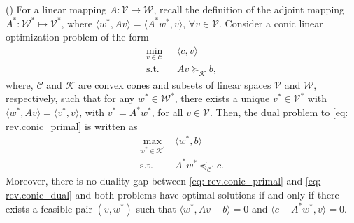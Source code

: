\documentclass[final,onefignum,onetabnum]{class}
\newcommand{\Cs}[1]{\mathcal{#1}} %
\newcommand{\dual}[1]{\Cs{#1}^{\prime}}
\newcommand{\st}{\text{s.t.}}
\begin{document}
\begin{theorem}{(\citet[Proposition~2.1]{shapiro2001duality})}
\label{thm: rev.conic_duality}
For a linear mapping $A: \Cs{V} \mapsto \Cs{W}$, recall the definition of the adjoint mapping $A^{*}: \Cs{W}^{*} \mapsto \Cs{V}^{*}$, where $\langle w^{*}, Av \rangle= \langle A^{*}w^{*}, v \rangle$, $\forall v \in \Cs{V}$. 
Consider a conic linear optimization problem of the form
\begin{subequations}
\label{eq: rev.conic_primal}
\begin{align}
    \min_{v \in \Cs{C}} \ & \langle c,v \rangle \\
    \st \quad &   Av  \succcurlyeq_{\Cs{K}} b,
\end{align}
\end{subequations}
where, $\Cs{C} $ and $\Cs{K}$ are convex cones and subsets of linear spaces $\Cs{V}$ and $\Cs{W}$, respectively, such that for any $w^{*} \in \Cs{W}^{*}$, there exists a unique $v^{*} \in \Cs{V}^{*}$ with $\langle w^{*},Av \rangle=\langle v^{*},v \rangle$, with $v^{*}=A^{*}w^{*}$, for all $v \in \Cs{V}$. 
Then, the dual problem to \eqref{eq: rev.conic_primal} is written as 
\begin{subequations}
\label{eq: rev.conic_dual}
\begin{align}
    \max_{w^{*} \in \dual{K}} \ & \langle w^{*},b \rangle \\
    \st \quad &   A^{*}w^{*}  \preccurlyeq_{\dual{C}} c.
\end{align}
\end{subequations}
Moreover, there is no duality gap between \eqref{eq: rev.conic_primal}  and \eqref{eq: rev.conic_dual} and both problems have optimal solutions if and only if there exists a feasible pair $(v, w^{*})$ such that $\langle w^{*},Av-b \rangle=0$ and $\langle c-A^{*}w^{*},v \rangle=0$.  
\end{theorem}

\end{document}
